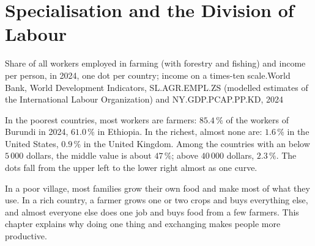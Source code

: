 \chapter{Specialisation and the Division of Labour}\label{ch:g7:specialisation}

\begin{openingchart}{Share of all workers employed in farming (with forestry and
fishing) and income per person, in 2024, one dot per country; income on a times-ten
scale.}{World Bank, World Development Indicators, SL.AGR.EMPL.ZS (modelled
estimates of the International Labour Organization) and NY.GDP.PCAP.PP.KD, 2024}
\end{openingchart}

In the poorest countries, most workers are farmers: $85.4\,\%$ of the workers of
Burundi in 2024, $61.0\,\%$ in Ethiopia. In the richest, almost none are: $1.6\,\%$ in
the United States, $0.9\,\%$ in the United Kingdom. Among the countries with an
 below $5\,000$ dollars, the middle value is about $47\,\%$; above
$40\,000$ dollars, $2.3\,\%$. The dots fall from the upper left to the lower right
almost as one curve.

In a poor village, most families grow their own food and make most of what they use.
In a rich country, a farmer grows one or two crops and buys everything else, and
almost everyone else does one job and buys food from a few farmers. This chapter
explains why doing one thing and exchanging makes people more productive.

